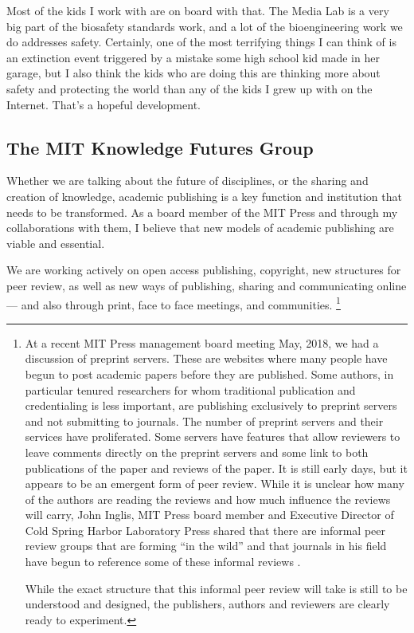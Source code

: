 Most of the kids I work with are on board with that. The Media Lab is a very big part of the biosafety standards work, and a lot of the bioengineering work we do addresses safety. Certainly, one of the most terrifying things I can think of is an extinction event triggered by a mistake some high school kid made in her garage, but I also think the kids who are doing this are thinking more about safety and protecting the world than any of the kids I grew up with on the Internet. That's a hopeful development.

\subsection{The MIT Knowledge Futures Group}
\label{MITPress}

Whether we are talking about the future of disciplines, or the sharing and creation of knowledge, academic publishing is a key function and institution that needs to be transformed. As a board member of the MIT Press and through my collaborations with them, I believe that new models of academic publishing are viable and essential.

We are working actively on open access publishing, copyright, new structures for peer review, as well as new ways of publishing, sharing and communicating online --- and also through print, face to face meetings, and communities. \footnote{At a recent MIT Press management board meeting May, 2018, we had a discussion of preprint servers. These are websites where many people have begun to post academic papers before they are published. Some authors, in particular tenured researchers for whom traditional publication and credentialing is less important, are publishing exclusively to preprint servers and not submitting to journals. The number of preprint servers and their services have proliferated. Some servers have features that allow reviewers to leave comments directly on the preprint servers and some link to both publications of the paper and reviews of the paper. It is still early days, but it appears to be an emergent form of peer review. While it is unclear how many of the authors are reading the reviews and how much influence the reviews will carry, John Inglis, MIT Press board member and Executive Director of Cold Spring Harbor Laboratory Press shared that there are informal peer review groups that are forming ``in the wild'' and that journals in his field have begun to reference some of these informal reviews \cite{mitpressboard2018}.

While the exact structure that this informal peer review will take is still to be understood and designed, the publishers, authors and reviewers are clearly ready to experiment.}

